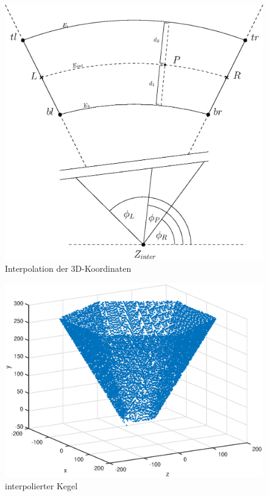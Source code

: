 \begin{figure}[!htb]
	\centering
	\includegraphics[scale=.6]{images/radialInterpolation.eps}
	\caption{Interpolation der 3D-Koordinaten}
	\label{fig:radialInterpolation}
\end{figure}


\begin{figure}[!htb]
	\centering
	\includegraphics[scale=.7]{images/3d_interpol.eps}
	\caption{interpolierter Kegel}
	\label{fig:3DInterpol}
\end{figure}

